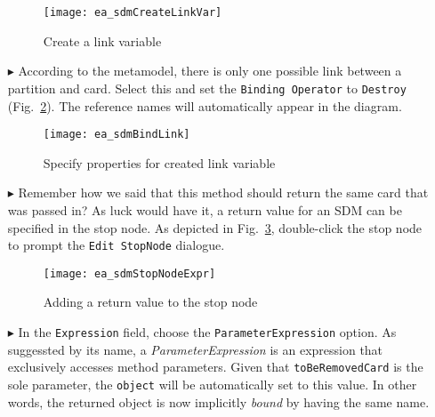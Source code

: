 \begin{itemize}
\begin{figure}[htpb]
\begin{center}
  \texttt{[image: ea\_sdmCreateLinkVar]}
  \caption{Create a link variable}   
  \label{ea:link_variable}
\end{center}
\end{figure}

\item[$\blacktriangleright$] According to the metamodel, there is only one possible link between a partition and card. Select this and set the
\texttt{Binding Operator} to \texttt{Destroy} (Fig.~\ref{ea:link_variable_properties}). The reference names will automatically appear in the diagram.

\vspace{0.5cm}

\begin{figure}[h!]
\begin{center} 
 \texttt{[image: ea\_sdmBindLink]}
  \caption{Specify properties for created link variable}  
  \label{ea:link_variable_properties}
\end{center}
\end{figure}

\vspace{0.5cm}

\item[$\blacktriangleright$] Remember how we said that this method should return the same card that was passed in? As luck would have it, a return value for an
SDM can be specified in the stop node. As depicted in Fig.~\ref{ea:stop_node_return_value}, double-click the stop node to prompt the \texttt{Edit StopNode}
dialogue.

\newpage

\begin{figure}[htbp]
\begin{center}
  \texttt{[image: ea\_sdmStopNodeExpr]}
  \caption{Adding a return value to the stop node}  
  \label{ea:stop_node_return_value}
\end{center}
\end{figure}

\item[$\blacktriangleright$] In the \texttt{Expression} field, choose the \texttt{ParameterExpression} option.
As suggessted by its name, a \emph{ParameterExpression} is an expression that exclusively accesses method parameters. Given that \texttt{toBeRemovedCard} is the sole
parameter, the \texttt{object} will be automatically set to this value. In other words, the returned object is now implicitly \emph{bound} by having the same
name.


\end{itemize}
